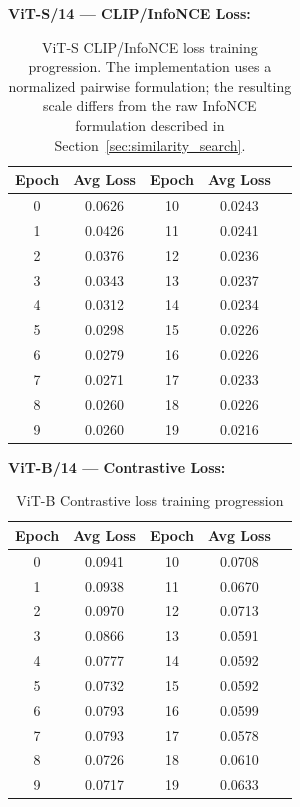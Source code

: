 \documentclass[
    english,
]{VUMIFPSbakalaurinis}
\begin{document}
\textbf{ViT-S/14 — CLIP/InfoNCE Loss:}
\begin{table}[H]
\centering
\small
\begin{tabular}{ccccc}
\toprule
\textbf{Epoch} & \textbf{Avg Loss} & \textbf{Epoch} & \textbf{Avg Loss} \\
\midrule
0 & 0.0626 & 10 & 0.0243 \\
1 & 0.0426 & 11 & 0.0241 \\
2 & 0.0376 & 12 & 0.0236 \\
3 & 0.0343 & 13 & 0.0237 \\
4 & 0.0312 & 14 & 0.0234 \\
5 & 0.0298 & 15 & 0.0226 \\
6 & 0.0279 & 16 & 0.0226 \\
7 & 0.0271 & 17 & 0.0233 \\
8 & 0.0260 & 18 & 0.0226 \\
9 & 0.0260 & 19 & 0.0216 \\
\bottomrule
\end{tabular}
\caption{ViT-S CLIP/InfoNCE loss training progression. The implementation uses a normalized pairwise formulation; the resulting scale differs from the raw InfoNCE formulation described in Section~\ref{sec:similarity_search}.}
\end{table}

\textbf{ViT-B/14 — Contrastive Loss:}
\begin{table}[H]
\centering
\small
\begin{tabular}{ccccc}
\toprule
\textbf{Epoch} & \textbf{Avg Loss} & \textbf{Epoch} & \textbf{Avg Loss} \\
\midrule
0 & 0.0941 & 10 & 0.0708 \\
1 & 0.0938 & 11 & 0.0670 \\
2 & 0.0970 & 12 & 0.0713 \\
3 & 0.0866 & 13 & 0.0591 \\
4 & 0.0777 & 14 & 0.0592 \\
5 & 0.0732 & 15 & 0.0592 \\
6 & 0.0793 & 16 & 0.0599 \\
7 & 0.0793 & 17 & 0.0578 \\
8 & 0.0726 & 18 & 0.0610 \\
9 & 0.0717 & 19 & 0.0633 \\
\bottomrule
\end{tabular}
\caption{ViT-B Contrastive loss training progression}
\end{table}
\end{document}
